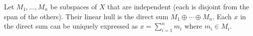 Let $M_1, \ldots, M_n$ be subspaces of $X$ that are independent (each is disjoint from the span of the others). Their linear hull is the direct sum $M_1 \oplus \cdots \oplus M_n$. Each $x$ in the direct sum can be uniquely expressed as $x = \sum_{i=1}^n m_i$ where $m_i \in M_i$.